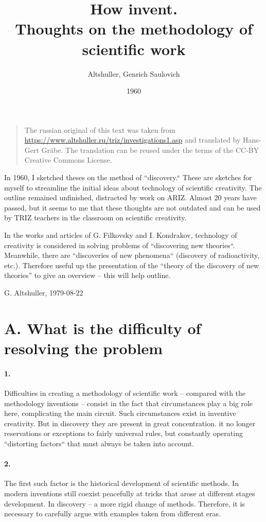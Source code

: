 \documentclass[11pt,a4paper]{article}
\title{How invent.\\ Thoughts on the methodology of scientific work}
\author{Altshuller, Genrich Saulovich}
\date{1960}
\begin{document}
\maketitle

\begin{quote}
  The russian original of this text was taken from
  \url{https://www.altshuller.ru/triz/investigations1.asp} and translated by
  Hans-Gert Gr\"abe.  The translation can be reused under the terms of the
  CC-BY Creative Commons License.
\end{quote}

In 1960, I sketched theses on the method of “discovery.“ These are sketches
for myself to streamline the initial ideas about technology of scientific
creativity.  The outline remained unfinished, distracted by work on ARIZ.
Almost 20 years have passed, but it seems to me that these thoughts are not
outdated and can be used by TRIZ teachers in the classroom on scientific
creativity.

In the works and articles of G. Filkovsky and I. Kondrakov, technology of
creativity is considered in solving problems of “discovering new theories“.
Meanwhile, there are “discoveries of new phenomena“ (discovery of
radioactivity, etc.). Therefore useful up the presentation of the “theory of
the discovery of new theories” to give an overview -- this will help outline.
\begin{flushright}
G. Altshuller, 1979-08-22
\end{flushright}

\section*{A. What is the difficulty of resolving the problem}

\paragraph{1.}
Difficulties in creating a methodology of scientific work -- compared with the
methodology inventions -- consist in the fact that circumstances play a big
role here, complicating the main circuit. Such circumstances exist in
inventive creativity. But in discovery they are present in great
concentration. it no longer reservations or exceptions to fairly universal
rules, but constantly operating “distorting factors“ that must always be taken
into account.

\paragraph{2.}
The first such factor is the historical development of scientific methods. In
modern inventions still coexist peacefully at tricks that arose at different
stages development. In discovery -- a more rigid change of methods. Therefore,
it is necessary to carefully argue with examples taken from different eras.
\end{document}
